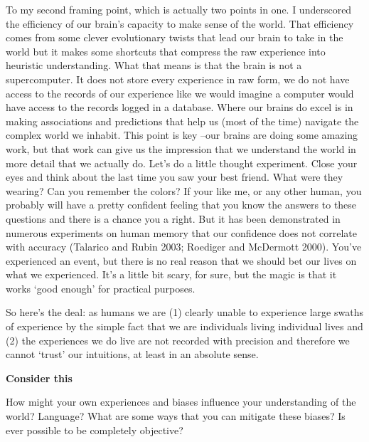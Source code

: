 \documentclass[
  letterpaper,
]{latex/krantz}
\begin{document}
To my second framing point, which is actually two points in one. I
underscored the efficiency of our brain's capacity to make sense of the
world. That efficiency comes from some clever evolutionary twists that
lead our brain to take in the world but it makes some shortcuts that
compress the raw experience into heuristic understanding. What that
means is that the brain is not a supercomputer. It does not store every
experience in raw form, we do not have access to the records of our
experience like we would imagine a computer would have access to the
records logged in a database. Where our brains do excel is in making
associations and predictions that help us (most of the time) navigate
the complex world we inhabit. This point is key --our brains are doing
some amazing work, but that work can give us the impression that we
understand the world in more detail that we actually do. Let's do a
little thought experiment. Close your eyes and think about the last time
you saw your best friend. What were they wearing? Can you remember the
colors? If your like me, or any other human, you probably will have a
pretty confident feeling that you know the answers to these questions
and there is a chance you a right. But it has been demonstrated in
numerous experiments on human memory that our confidence does not
correlate with accuracy (Talarico and Rubin 2003; Roediger and McDermott
2000). You've experienced an event, but there is no real reason that we
should bet our lives on what we experienced. It's a little bit scary,
for sure, but the magic is that it works `good enough' for practical
purposes.

So here's the deal: as humans we are (1) clearly unable to experience
large swaths of experience by the simple fact that we are individuals
living individual lives and (2) the experiences we do live are not
recorded with precision and therefore we cannot `trust' our intuitions,
at least in an absolute sense.

\begin{tcolorbox}[enhanced jigsaw, left=2mm, arc=.35mm, colback=white, rightrule=.15mm, toprule=.15mm, breakable, leftrule=.75mm, opacityback=0, bottomrule=.15mm]

\textbf{ Consider this}

How might your own experiences and biases influence your understanding
of the world? Language? What are some ways that you can mitigate these
biases? Is ever possible to be completely objective?

\end{tcolorbox}
\end{document}
